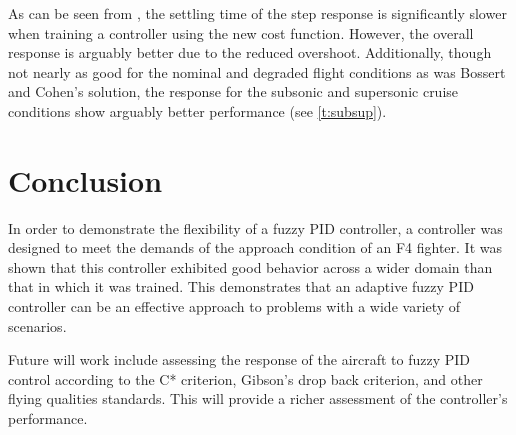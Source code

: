 As can be seen from , the settling time of the step response is significantly
slower when training a controller using the new cost function. However, the overall response is arguably better due
to the reduced overshoot. Additionally, though not nearly as good for the nominal and degraded flight conditions as was Bossert and
Cohen's solution, the response for the subsonic and supersonic cruise conditions show arguably better
performance (see \cref{t:subsup}).

\section{Conclusion}
In order to demonstrate the flexibility of a fuzzy PID controller, a controller was designed to meet the
demands of the approach condition of an F4 fighter. It was shown that this controller exhibited good behavior
across a wider domain than that in which it was trained. This demonstrates that an adaptive fuzzy PID
controller can be an effective approach to problems with a wide variety of scenarios.

Future will work include assessing the response of the aircraft to fuzzy PID control according to the C*
criterion, Gibson's drop back criterion, and other flying qualities standards\cite{standard1990flying}. This will provide a richer
assessment of the controller's performance.
